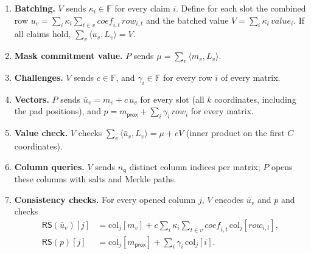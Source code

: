 \documentclass[11pt,a4paper]{article}
\newcommand{\F}{\mathbb{F}}
\newcommand{\RS}{\mathsf{RS}}
\newcommand{\ip}[2]{\langle #1, #2\rangle}
\newcommand{\nq}{n_{\mathsf{q}}}
\theoremstyle{definition}
\theoremstyle{plain}
\begin{document}
\begin{enumerate}[leftmargin=1.5em]
\item \textbf{Batching.} $V$ sends $\kappa_i\in\F$ for every claim $i$. Define for each slot the combined row
  $u_v=\sum_i\kappa_i\sum_{t\in v}\mathit{coef}_{i,t}\,\mathit{row}_{i,t}$ and the batched value
  $V=\sum_i\kappa_i\,\mathit{value}_i$. If all claims hold, $\sum_v\ip{u_v}{L_v}=V$.
\item \textbf{Mask commitment value.} $P$ sends $\mu=\sum_v\ip{m_v}{L_v}$.
\item \textbf{Challenges.} $V$ sends $c\in\F$, and $\gamma_i\in\F$ for every row $i$ of every matrix.
\item \textbf{Vectors.} $P$ sends $\bar u_v=m_v+c\,u_v$ for every slot (all $k$ coordinates, including
  the pad positions), and $p=m_{\mathsf{prox}}+\sum_i\gamma_i\,\mathit{row}_i$ for every matrix.
\item \textbf{Value check.} $V$ checks $\sum_v\ip{\bar u_v}{L_v}=\mu+cV$ (inner product on the first $C$
  coordinates).
\item \textbf{Column queries.} $V$ sends $\nq$ distinct column indices per matrix; $P$ opens these columns
  with salts and Merkle paths.
\item \textbf{Consistency checks.} For every opened column $j$, $V$ encodes $\bar u_v$ and $p$ and checks
  \begin{align*}
   \RS(\bar u_v)[j]&=\mathrm{col}_j[m_v]+c\sum_i\kappa_i\sum_{t\in v}\mathit{coef}_{i,t}\,\mathrm{col}_j[\mathit{row}_{i,t}],\\
   \RS(p)[j]&=\mathrm{col}_j[m_{\mathsf{prox}}]+\sum_i\gamma_i\,\mathrm{col}_j[i].
  \end{align*}
\end{enumerate}
\end{document}

